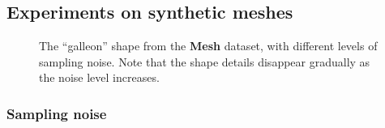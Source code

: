 \subsection{Experiments on synthetic meshes}

\begin{figure}[ht]
\centering
{}
\vspace{-4mm}
\caption{The ``galleon'' shape from the \textbf{Mesh} dataset, with different levels of sampling noise. Note that the shape details disappear gradually as the noise level increases.}
\label{fig:noisesample}
\end{figure}

\subsubsection{Sampling noise}

